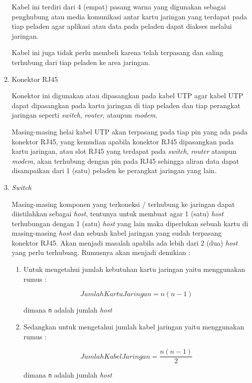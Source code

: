 \documentclass[pdftex,12pt, oneside]{article}
\begin{document}
\begin{enumerate}
Kabel ini terdiri dari 4 (empat) pasang warna yang digunakan sebagai penghubung atau media komunikasi antar kartu jaringan yang terdapat pada tiap peladen agar aplikasi atau data pada peladen dapat diakses melalui jaringan.

Kabel ini juga tidak perlu membeli karena telah terpasang dan saling terhubung dari tiap peladen ke area jaringan.	
	
	\item Konektor RJ45
	
Konektor ini digunakan atau dipasangkan pada kabel UTP agar kabel UTP dapat dipasangkan pada kartu jaringan di tiap peladen dan tiap perangkat jaringan seperti \textit{switch}, \textit{router}, ataupun \textit{modem}. 

Masing-masing helai kabel UTP akan terpasang pada tiap pin yang ada pada konektor RJ45, yang kemudian apabila konektor RJ45 dipasangkan pada kartu jaringan, atau slot RJ45 yang terdapat pada \textit{switch}, \textit{router} ataupun \textit{modem}, akan terhubung dengan pin pada RJ45 sehingga aliran data dapat disampaikan dari 1 (satu) peladen ke perangkat jaringan yang lain.	
	
	\item \textit{Switch}
	
Masing-masing komponen yang terkoneksi / terhubung ke jaringan dapat diistilahkan sebagai \textit{host}, tentunya untuk membuat agar 1 (satu) \textit{host} terhubungan dengan 1 (satu) \textit{host} yang lain maka diperlukan sebuah kartu di masing-masing	\textit{host} dan sebuah kabel jaringan yang sudah terpasang konektor RJ45. Akan menjadi masalah apabila ada lebih dari 2 (dua) \textit{host} yang perlu terhubung. Rumusnya akan menjadi demikian :

	\begin{enumerate}
		\item Untuk mengetahui jumlah kebutuhan kartu jaringan yaitu menggunakan rumus :

\[ JumlahKartuJaringan = n(n - 1) \]		

dimana \texttt{n} adalah jumlah \textit{host}

		\item Sedangkan untuk mengetahui jumlah kabel jaringan yaitu menggunakan rumus :
		
\[ JumlahKabelJaringan = \frac{n(n-1)}{2} \]

dimana \texttt{n} adalah jumlah \textit{host}
		
	\end{enumerate}
	

\end{enumerate}
\end{document}
